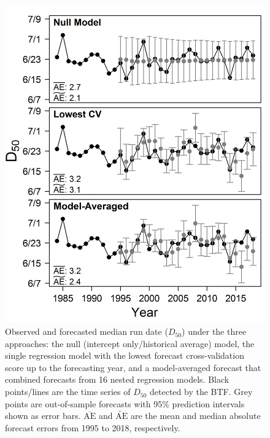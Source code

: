 \documentclass[12pt,]{book}
\theoremstyle{definition}
\theoremstyle{definition}
\theoremstyle{definition}
\theoremstyle{remark}
\begin{document}
\begin{figure}
  \centering
  \includegraphics{img/Ch2/forecasts.png}
  \caption{Observed and forecasted median run date ($D_{50}$) under the three approaches: the null (intercept only/historical average) model, the single regression model with the lowest forecast cross-validation score up to the forecasting year, and a model-averaged forecast that combined forecasts from 16 nested regression models. Black points/lines are the time series of $D_{50}$ detected by the BTF. Grey points are out-of-sample forecasts with 95$\%$ prediction intervals shown as error bars. $\overline{\text{AE}}$ and $\widetilde{\text{AE}}$ are the mean and median absolute forecast errors from 1995 to 2018, respectively.}
  \label{fig:forecasts}
\end{figure}

\clearpage
\end{document}
